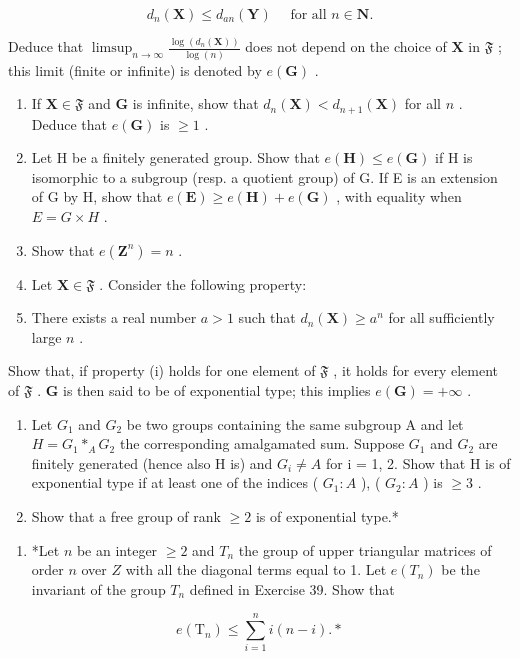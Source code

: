 \[
d _ {n} (\mathbf {X}) \leqslant d _ {a n} (\mathbf {Y}) \quad \text { for   all } n \in \mathbf {N}.
\]

Deduce that \(\limsup_{n\to \infty}\frac{\log(d_n(\mathbf{X}))}{\log(n)}\) does not depend on the choice of \(\mathbf{X}\) in \(\mathfrak{F}\) ; this limit (finite or infinite) is denoted by \(e(\mathbf{G})\) .

\begin{enumerate}
\def\labelenumi{(\alph{enumi})}
\setcounter{enumi}{1}
\item
  If \(\mathbf{X} \in \mathfrak{F}\) and \(\mathbf{G}\) is infinite, show that \(d_n(\mathbf{X}) < d_{n+1}(\mathbf{X})\) for all \(n\) . Deduce that \(e(\mathbf{G})\) is \(\geqslant 1\) .
\item
  Let H be a finitely generated group. Show that \(e(\mathbf{H}) \leqslant e(\mathbf{G})\) if H is isomorphic to a subgroup (resp. a quotient group) of G. If E is an extension of G by H, show that \(e(\mathbf{E}) \geqslant e(\mathbf{H}) + e(\mathbf{G})\) , with equality when \(E = G \times H\) .
\item
  Show that \(e(\mathbf{Z}^n) = n\) .
\item
  Let \(\mathbf{X} \in \mathfrak{F}\) . Consider the following property:
\item
  There exists a real number \(a > 1\) such that \(d_n(\mathbf{X}) \geqslant a^n\) for all sufficiently large \(n\) .
\end{enumerate}

Show that, if property (i) holds for one element of \(\mathfrak{F}\) , it holds for every element of \(\mathfrak{F}\) . \(\mathbf{G}\) is then said to be of exponential type; this implies \(e(\mathbf{G}) = +\infty\) .

\begin{enumerate}
\def\labelenumi{(\alph{enumi})}
\setcounter{enumi}{5}
\item
  Let \(G_{1}\) and \(G_{2}\) be two groups containing the same subgroup A and let \(H = G_{1} *_{A} G_{2}\) the corresponding amalgamated sum. Suppose \(G_{1}\) and \(G_{2}\) are finitely generated (hence also H is) and \(G_{i} \neq A\) for i = 1, 2. Show that H is of exponential type if at least one of the indices ( \(G_{1}:A\) ), ( \(G_{2}:A\) ) is \(\geqslant 3\) .
\item
  Show that a free group of rank \(\geqslant 2\) is of exponential type.*
\end{enumerate}

\begin{enumerate}
\def\labelenumi{\arabic{enumi}.}
\setcounter{enumi}{39}
\tightlist
\item
  *Let \(n\) be an integer \(\geqslant 2\) and \(T_n\) the group of upper triangular matrices of order \(n\) over \(Z\) with all the diagonal terms equal to 1. Let \(e(T_n)\) be the invariant of the group \(T_n\) defined in Exercise 39. Show that
\end{enumerate}

\[
e (\mathrm{T} _ {n}) \leqslant \sum_ {i = 1} ^ {n} i (n - i). *
\]

